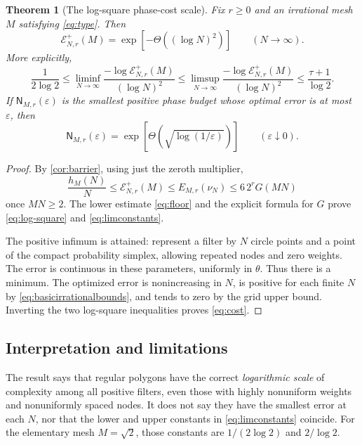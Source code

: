\documentclass[11pt,a4paper]{article}
\numberwithin{equation}{section}
\theoremstyle{plain}
\newtheorem{theorem}{Theorem}[section]
\theoremstyle{definition}
\theoremstyle{remark}
\newcommand{\Err}{\mathcal E}
\begin{document}
\begin{theorem}[The log-square phase-cost scale]\label{thm:complexity}
Fix $r\ge0$ and an irrational mesh $M$ satisfying \eqref{eq:type}. Then
\begin{equation}\label{eq:log-square}
 \Err^+_{N,r}(M)=\exp[-\Theta((\log N)^2)]\qquad(N\to\infty).
\end{equation}
More explicitly,
\begin{equation}\label{eq:limconstants}
 \frac1{2\log2}
 \le\liminf_{N\to\infty}\frac{-\log\Err^+_{N,r}(M)}{(\log N)^2}
 \le\limsup_{N\to\infty}\frac{-\log\Err^+_{N,r}(M)}{(\log N)^2}
 \le\frac{\tau+1}{\log2}.
\end{equation}
If $\mathsf N_{M,r}(\varepsilon)$ is the smallest positive phase budget whose
optimal error is at most $\varepsilon$, then
\begin{equation}\label{eq:cost}
 \mathsf N_{M,r}(\varepsilon)
 =\exp[\Theta(\sqrt{\log(1/\varepsilon)})]
 \qquad(\varepsilon\downarrow0).
\end{equation}
\end{theorem}
\begin{proof}
By \cref{cor:barrier}, using just the zeroth multiplier,
\begin{equation}\label{eq:basicirrationalbounds}
 \frac{h_M(N)}N\le\Err^+_{N,r}(M)
 \le E_{M,r}(\nu_N)\le6\,2^rG(MN)
\end{equation}
once $MN\ge2$. The lower estimate \eqref{eq:floor} and the explicit formula
for $G$ prove \eqref{eq:log-square} and \eqref{eq:limconstants}.

The positive infimum is attained: represent a filter by $N$ circle points
and a point of the compact probability simplex, allowing repeated nodes and
zero weights. The error is continuous in these parameters, uniformly in
$\theta$. Thus there is a minimum. The optimized error is nonincreasing in
$N$, is positive for each finite $N$ by \eqref{eq:basicirrationalbounds}, and
tends to zero by the grid upper bound. Inverting the two log-square
inequalities proves \eqref{eq:cost}.
\end{proof}

\subsection{Interpretation and limitations}

The result says that regular polygons have the correct \emph{logarithmic
scale} of complexity among all positive filters, even those with highly
nonuniform weights and nonuniformly spaced nodes. It does not say they have
the smallest error at each $N$, nor that the lower and upper constants in
\eqref{eq:limconstants} coincide. For the elementary mesh $M=\sqrt2$, those
constants are $1/(2\log2)$ and $2/\log2$.
\end{document}
